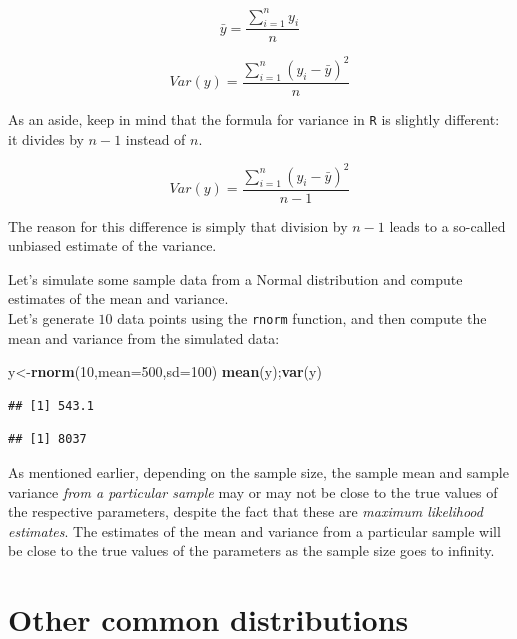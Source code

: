 \documentclass[12pt,]{krantz}
\newenvironment{Shaded}{\begin{snugshade}}{\end{snugshade}}
\newcommand{\DataTypeTok}[1]{\textcolor[rgb]{0.13,0.29,0.53}{#1}}
\newcommand{\DecValTok}[1]{\textcolor[rgb]{0.00,0.00,0.81}{#1}}
\newcommand{\KeywordTok}[1]{\textcolor[rgb]{0.13,0.29,0.53}{\textbf{#1}}}
\newcommand{\NormalTok}[1]{#1}
\begin{document}
\begin{equation}
\bar{y} =  \frac{\sum_{i=1}^n y_i}{n} 
\end{equation}

\begin{equation}
Var(y) = \frac{\sum_{i=1}^n (y_i-
\bar{y})^2}{n}
\end{equation}

As an aside, keep in mind that the formula for variance in \texttt{R} is slightly different: it divides by \(n-1\) instead of \(n\).

\begin{equation}
Var(y) = \frac{\sum_{i=1}^n (y_i-
\bar{y})^2}{n-1}
\end{equation}

The reason for this difference is simply that division by \(n-1\) leads to a so-called unbiased estimate of the variance.

Let's simulate some sample data from a Normal distribution and compute estimates of the mean and variance.\\
Let's generate \(10\) data points using the \texttt{rnorm} function, and then compute the mean and variance from the simulated data:

\begin{Shaded}
\begin{Highlighting}[]
\NormalTok{y<-}\KeywordTok{rnorm}\NormalTok{(}\DecValTok{10}\NormalTok{,}\DataTypeTok{mean=}\DecValTok{500}\NormalTok{,}\DataTypeTok{sd=}\DecValTok{100}\NormalTok{)}
\KeywordTok{mean}\NormalTok{(y);}\KeywordTok{var}\NormalTok{(y)}
\end{Highlighting}
\end{Shaded}

\begin{verbatim}
## [1] 543.1
\end{verbatim}

\begin{verbatim}
## [1] 8037
\end{verbatim}

As mentioned earlier, depending on the sample size, the sample mean and sample variance \emph{from a particular sample} may or may not be close to the true values of the respective parameters, despite the fact that these are \emph{maximum likelihood estimates}. The estimates of the mean and variance from a particular sample will be close to the true values of the parameters as the sample size goes to infinity.

\hypertarget{other-common-distributions}{%
\section{Other common distributions}\label{other-common-distributions}}
\end{document}
